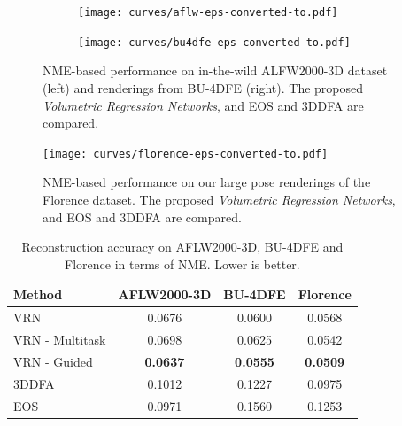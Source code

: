 \begin{figure}
\centering
\begin{subfigure}[t]{0.43\textwidth}
\centering
  \texttt{[image: curves/aflw-eps-converted-to.pdf]}
  \label{roc:aflw2000}
\end{subfigure}
\hspace{13mm}
\begin{subfigure}[t]{0.43\textwidth}
\centering
  \texttt{[image: curves/bu4dfe-eps-converted-to.pdf]}
  \label{roc:bu4dfe}
\end{subfigure}
\vspace{-13pt}
\caption{NME-based performance on in-the-wild ALFW2000-3D dataset (left) and renderings from BU-4DFE (right).  The proposed \textit{Volumetric Regression Networks}, and EOS and 3DDFA are compared.}
\label{roc:combined}
\vspace{-4mm}
\end{figure}

\begin{figure}
\centering
  \texttt{[image: curves/florence-eps-converted-to.pdf]}
\caption{NME-based performance on our large pose renderings of the Florence dataset. The proposed \textit{Volumetric Regression Networks}, and EOS and 3DDFA are compared.}
  \label{roc:florence}
\end{figure}



\begin{table}
  \caption{Reconstruction accuracy on AFLW2000-3D, BU-4DFE and Florence in terms of NME. Lower is better.}
  \label{tab:overview}
  \centering
  \small
\begin{tabular}{|l||c|c|c|}
  \hline
  \textbf{Method}   & \textbf{AFLW2000-3D} & \textbf{BU-4DFE} & \textbf{Florence} \\
  \hline\hline
  VRN & 0.0676   & 0.0600 & 0.0568   \\
  VRN - Multitask   & 0.0698        & 0.0625     & 0.0542        \\
  VRN - Guided    & \textbf{0.0637}   & \textbf{0.0555} & \textbf{0.0509}   \\
\hline
  3DDFA~\cite{zhu2016face}             & 0.1012   & 0.1227 & 0.0975   \\
  EOS~\cite{huber2016multiresolution}  & 0.0971   & 0.1560 & 0.1253   \\
  \hline
\end{tabular}
\vspace{-4mm}
\end{table}


